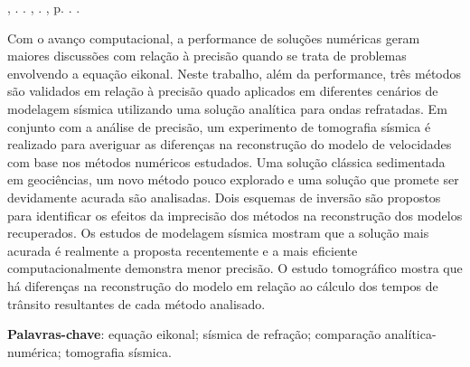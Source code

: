 \setlength{\absparsep}{18pt} %
\begin{resumo}
    \fonteResumo

\begin{flushleft}
\MakeUppercase{\imprimirSobrenome}, \imprimirPrimeirosNomes. \textbf{\imprimirtitulo}. \imprimirtipotrabalho, \imprimirinstituicao. \imprimirlocal,  p. \pageref{LastPage}. \imprimirAnoDeDefesa.
\end{flushleft}

	Com o avanço computacional, a performance de soluções numéricas geram maiores discussões com relação à precisão quando se trata de problemas envolvendo a equação eikonal. Neste trabalho, além da performance, três métodos são validados em relação à precisão quado aplicados em diferentes cenários de modelagem sísmica utilizando uma solução analítica para ondas refratadas. Em conjunto com a análise de precisão, um experimento de tomografia sísmica é realizado para averiguar as diferenças na reconstrução do modelo de velocidades com base nos métodos numéricos estudados. Uma solução clássica sedimentada em geociências, um novo método pouco explorado e uma solução que promete ser devidamente acurada são analisadas. Dois esquemas de inversão são propostos para identificar os efeitos da imprecisão dos métodos na reconstrução dos modelos recuperados. Os estudos de modelagem sísmica mostram que a solução mais acurada é realmente a proposta recentemente e a mais eficiente computacionalmente demonstra menor precisão. O estudo tomográfico mostra que há diferenças na reconstrução do modelo em relação ao cálculo dos tempos de trânsito resultantes de cada método analisado.     
	
    \textbf{Palavras-chave}: equação eikonal; sísmica de refração; comparação analítica-numérica; tomografia sísmica.
\end{resumo}
